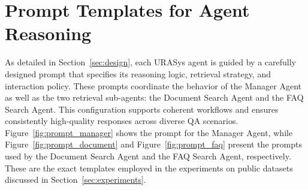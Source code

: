 \documentclass[11pt]{article}
\begin{document}
\section{Prompt Templates for Agent Reasoning}
\label{sec:prompt-appendix}

As detailed in Section~\ref{sec:design}, each URASys agent is guided by a carefully designed prompt that specifies its reasoning logic, retrieval strategy, and interaction policy. These prompts coordinate the behavior of the Manager Agent as well as the two retrieval sub-agents: the Document Search Agent and the FAQ Search Agent. This configuration supports coherent workflows and ensures consistently high-quality responses across diverse QA scenarios. Figure~\ref{fig:prompt_manager} shows the prompt for the Manager Agent, while Figure~\ref{fig:prompt_document} and Figure~\ref{fig:prompt_faq} present the prompts used by the Document Search Agent and the FAQ Search Agent, respectively. These are the exact templates employed in the experiments on public datasets discussed in Section~\ref{sec:experiments}.
\end{document}
